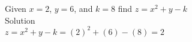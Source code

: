 Given \mbox{$x=2$}, \mbox{$y=6$}, and \mbox{$k=8$} find $z = x^2+y-k$\\
\skipLine
Solution\\
\mbox{$z=x^2+y-k  = (2)^2+(6)-(8) = 2$}\\

